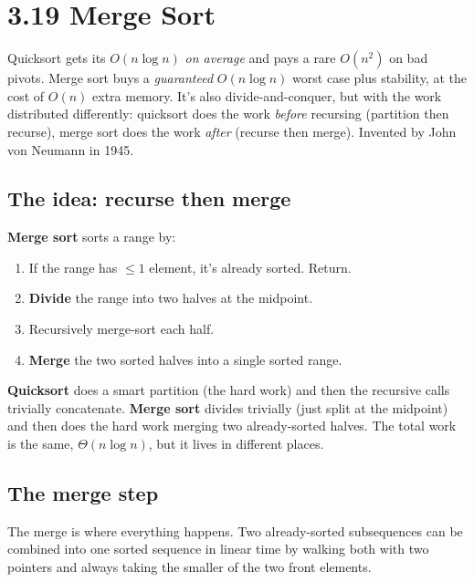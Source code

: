 \documentclass[11pt]{article}
\begin{document}
\section{3.19 Merge Sort}

Quicksort gets its $O(n \log n)$ \emph{on average} and pays a rare
$O(n^2)$ on bad pivots. Merge sort buys a \emph{guaranteed}
$O(n \log n)$ worst case plus stability, at the cost of $O(n)$ extra
memory. It's also divide-and-conquer, but with the work distributed
differently: quicksort does the work \emph{before} recursing
(partition then recurse), merge sort does the work \emph{after}
(recurse then merge). Invented by John von Neumann in 1945.

\subsection{The idea: recurse then merge}

\begin{defnbox}
\textbf{Merge sort} sorts a range by:
\begin{enumerate}[leftmargin=*]
  \item If the range has $\le 1$ element, it's already sorted.
        Return.
  \item \textbf{Divide} the range into two halves at the midpoint.
  \item Recursively merge-sort each half.
  \item \textbf{Merge} the two sorted halves into a single sorted
        range.
\end{enumerate}
\end{defnbox}

\begin{ideabox}
\textbf{Quicksort} does a smart partition (the hard work) and then
the recursive calls trivially concatenate. \textbf{Merge sort}
divides trivially (just split at the midpoint) and then does the
hard work merging two already-sorted halves. The total work is the
same, $\Theta(n \log n)$, but it lives in different places.
\end{ideabox}

\subsection{The merge step}

The merge is where everything happens. Two already-sorted
subsequences can be combined into one sorted sequence in linear
time by walking both with two pointers and always taking the
smaller of the two front elements.
\end{document}
